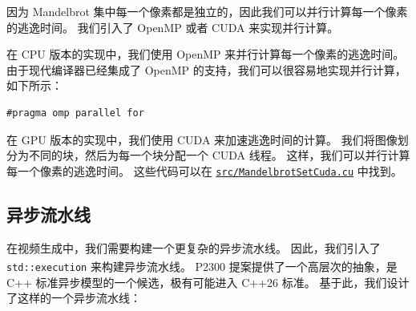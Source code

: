 \documentclass[11pt]{article}
\begin{document}
    因为 Mandelbrot 集中每一个像素都是独立的，因此我们可以并行计算每一个像素的逃逸时间。
    我们引入了 OpenMP 或者 CUDA 来实现并行计算。

    在 CPU 版本的实现中，我们使用 OpenMP 来并行计算每一个像素的逃逸时间。
    由于现代编译器已经集成了 OpenMP 的支持，我们可以很容易地实现并行计算，如下所示：

    \begin{lstlisting}[label={lst:openmp_parallel_for}, gobble=8]
        #pragma omp parallel for
    \end{lstlisting}

    在 GPU 版本的实现中，我们使用 CUDA 来加速逃逸时间的计算。
    我们将图像划分为不同的块，然后为每一个块分配一个 CUDA 线程。
    这样，我们可以并行计算每一个像素的逃逸时间。
    这些代码可以在 \href{https://github.com/AI1379/MandelbrotSet/blob/master/src/MandelbrotSetCuda.cu}
    {\texttt{src/MandelbrotSetCuda.cu}} 中找到。

    \subsection{异步流水线}\label{subsec:asynchronous-pipeline}

    在视频生成中，我们需要构建一个更复杂的异步流水线。
    因此，我们引入了 \texttt{std::execution}\textsuperscript{\cite{P2300Proposal}} 来构建异步流水线。
    P2300 提案提供了一个高层次的抽象，是 C++ 标准异步模型的一个候选，极有可能进入 C++26 标准。
    基于此，我们设计了这样的一个异步流水线：

    \vspace{0.1cm}
\end{document}
